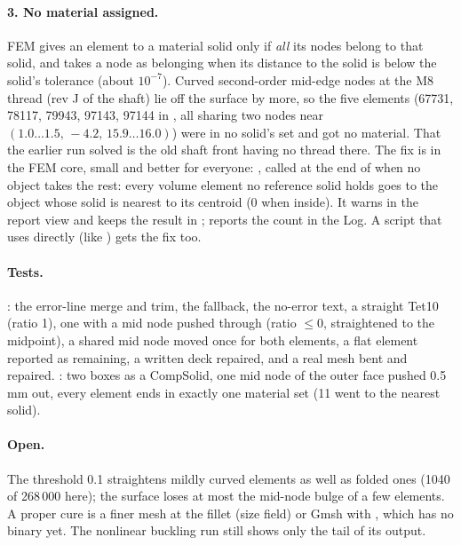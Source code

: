 \paragraph{3. No material assigned.} FEM gives an element to a material solid only if \emph{all} its nodes belong to that
solid, and  takes a node as belonging when its distance to the solid is below the solid's
tolerance (about $10^{-7}$). Curved second-order mid-edge nodes at the M8 thread (rev J of the shaft) lie off the surface by
more, so the five elements (67731, 78117, 79943, 97143, 97144 in , all sharing two nodes near
$(1.0\ldots1.5,\,-4.2,\,15.9\ldots16.0)$) were in no solid's set and got no material. That the earlier run solved is the old
shaft front having no thread there. The fix is in the FEM core, small and better for everyone:
, called at the end of  when no object takes the
rest: every volume element no reference solid holds goes to the object whose solid is nearest to its centroid (0 when inside).
It warns in the report view and keeps the result in ;  reports the count in
the Log. A script that uses  directly (like ) gets the fix too.

\paragraph{Tests.} : the error-line merge and trim, the  fallback, the
no-error text, a straight Tet10 (ratio 1), one with a mid node pushed through (ratio $\le 0$, straightened to the midpoint),
a shared mid node moved once for both elements, a flat element reported as remaining, a written deck repaired, and a real
mesh bent and repaired. : two boxes as a CompSolid, one mid node of
the outer face pushed 0.5\,mm out, every element ends in exactly one material set (11 went to the nearest solid).

\paragraph{Open.} The threshold 0.1 straightens mildly curved elements as well as folded ones (1040 of 268\,000 here); the surface
loses at most the mid-node bulge of a few elements. A proper cure is a finer mesh at the fillet (size field) or Gmsh with
, which has no binary yet. The nonlinear buckling run still shows only the tail of its output.
